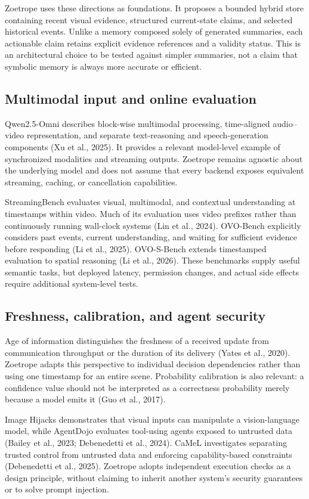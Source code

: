 \documentclass[11pt,letterpaper]{article}
\begin{document}
Zoetrope uses these directions as foundations. It proposes a bounded hybrid store containing recent visual evidence, structured current-state claims, and selected historical events. Unlike a memory composed solely of generated summaries, each actionable claim retains explicit evidence references and a validity status. This is an architectural choice to be tested against simpler summaries, not a claim that symbolic memory is always more accurate or efficient.

\subsection{Multimodal input and online evaluation}
Qwen2.5-Omni describes block-wise multimodal processing, time-aligned audio--video representation, and separate text-reasoning and speech-generation components (Xu et al., 2025). It provides a relevant model-level example of synchronized modalities and streaming outputs. Zoetrope remains agnostic about the underlying model and does not assume that every backend exposes equivalent streaming, caching, or cancellation capabilities.

StreamingBench evaluates visual, multimodal, and contextual understanding at timestamps within video. Much of its evaluation uses video prefixes rather than continuously running wall-clock systems (Lin et al., 2024). OVO-Bench explicitly considers past events, current understanding, and waiting for sufficient evidence before responding (Li et al., 2025). OVO-S-Bench extends timestamped evaluation to spatial reasoning (Li et al., 2026). These benchmarks supply useful semantic tasks, but deployed latency, permission changes, and actual side effects require additional system-level tests.

\subsection{Freshness, calibration, and agent security}
Age of information distinguishes the freshness of a received update from communication throughput or the duration of its delivery (Yates et al., 2020). Zoetrope adapts this perspective to individual decision dependencies rather than using one timestamp for an entire scene. Probability calibration is also relevant: a confidence value should not be interpreted as a correctness probability merely because a model emits it (Guo et al., 2017).

Image Hijacks demonstrates that visual inputs can manipulate a vision-language model, while AgentDojo evaluates tool-using agents exposed to untrusted data (Bailey et al., 2023; Debenedetti et al., 2024). CaMeL investigates separating trusted control from untrusted data and enforcing capability-based constraints (Debenedetti et al., 2025). Zoetrope adopts independent execution checks as a design principle, without claiming to inherit another system's security guarantees or to solve prompt injection.
\end{document}
